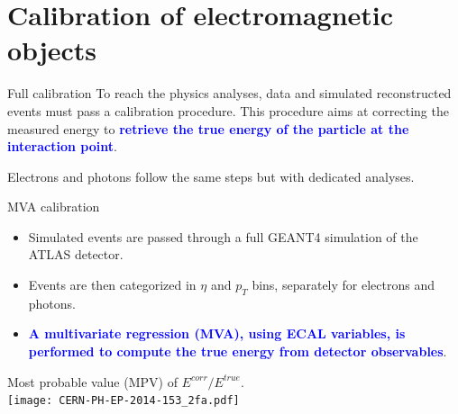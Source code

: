 \section{Calibration of electromagnetic objects}
\frame{\tableofcontents[currentsection]}
\begin{frame}{Full calibration}
  To reach the physics analyses, data and simulated reconstructed events must pass a calibration procedure.
  This procedure aims at correcting the measured energy to \textcolor{blue}{\bf retrieve the true energy of the particle at the interaction point}.
  \begin{center}
  \end{center}
  Electrons and photons follow the same steps but with dedicated analyses. 
\end{frame}
\begin{frame}{MVA calibration}
\begin{itemize}
\item Simulated events are passed through a full GEANT4 simulation of the ATLAS detector.
\item Events are then categorized in $\eta$ and $p_T$ bins, separately for electrons and photons.
\item \textcolor{blue}{\bf A multivariate regression (MVA), using ECAL variables, is performed to compute the true energy from detector observables}.
\end{itemize}

\begin{center}
  Most probable value (MPV) of $E^{corr}/E^{true}$.\\
  \texttt{[image: CERN-PH-EP-2014-153\_2fa.pdf]}
\end{center}

\end{frame}
